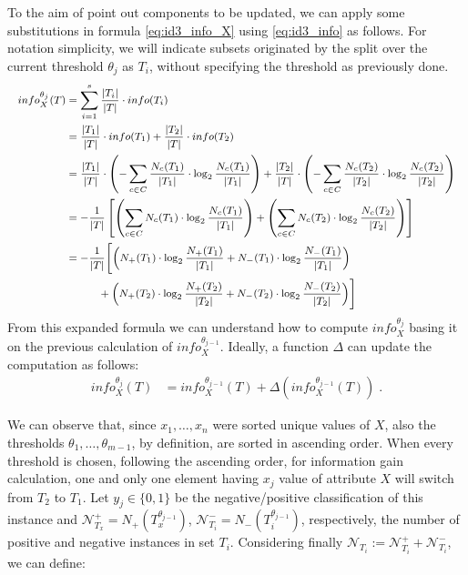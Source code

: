 \documentclass[12pt]{article}
\begin{document}
To the aim of point out components to be updated, we can apply some substitutions in formula \ref{eq:id3_info_X} using \ref{eq:id3_info} as follows.
For notation simplicity, we will indicate subsets originated by the split over the current threshold $\theta_j$ as $T_i$, without specifying the threshold as previously done.
%
\begin{equation*}
    \footnotesize
    \begin{aligned}
        info_X^{\theta_j}(T) & = \sum_{i=1}^s \frac{|T_i|}{|T|} \cdot info(T_i) \\
             & = \frac{|T_1|}{|T|} \cdot info(T_1) + \frac{|T_2|}{|T|} \cdot info(T_2)\\
             & = \frac{|T_1|}{|T|} \cdot \left( - \sum_{c \in C} \frac{N_c(T_1)}{|T_1|} \cdot \log_2 \frac{N_c(T_1)}{|T_1|} \right) + \frac{|T_2|}{|T|} \cdot \left( - \sum_{c \in C} \frac{N_c(T_2)}{|T_2|} \cdot \log_2 \frac{N_c(T_2)}{|T_2|} \right) \\
             & = - \frac 1 {|T|} \left[
                 \left( \sum_{c \in C} N_c(T_1) \cdot \log_2 \frac{N_c(T_1)}{|T_1|} \right) + 
                 \left( \sum_{c \in C} N_c(T_2) \cdot \log_2 \frac{N_c(T_2)}{|T_2|} \right)
             \right] \\
             & = - \frac 1 {|T|} \Biggl[
                 \left( N_+(T_1) \cdot \log_2 \frac{N_+(T_1)}{|T_1|} + N_-(T_1) \cdot \log_2 \frac{N_-(T_1)}{|T_1|} \right) \\
             & \qquad \quad + \left( N_+(T_2) \cdot \log_2 \frac{N_+(T_2)}{|T_2|} + N_-(T_2) \cdot \log_2 \frac{N_-(T_2)}{|T_2|} \right)
             \Biggr] 
    \end{aligned}
\end{equation*}
%
From this expanded formula we can understand how to compute $info_X^{\theta_j}$ basing it on the previous calculation of $info_X^{\theta_{j-1}}$. Ideally, a function $\Delta$ can update the computation as follows:
%
\begin{equation*}
    \begin{aligned}
        info_X^{\theta_{j}}(T) & = info_X^{\theta_{j-1}}(T) + \Delta(info_X^{\theta_{j-1}}(T)) \; .
    \end{aligned}
\end{equation*}

We can observe that, since $x_1, \dots, x_n$ were sorted unique values of $X$, also the thresholds $\theta_1, \dots, \theta_{m-1}$, by definition, are sorted in ascending order.
When every threshold is chosen, following the ascending order, for information gain calculation, one and only one element having $x_j$ value of attribute $X$ will switch from $T_2$ to $T_1$. Let $y_j\in \{0,1\}$ be the negative/positive classification of this instance and $\mathcal{N}_{T_x}^+ = N_+(T_x^{\theta_{j-1}})$, $\mathcal{N}_{T_i}^- = N_-(T_i^{\theta_{j-1}})$, respectively, the number of positive and negative instances in set $T_i$.
Considering finally $\mathcal{N}_{T_i} := \mathcal{N}_{T_i}^+ + \mathcal{N}_{T_i}^-$, we can define:
\end{document}
